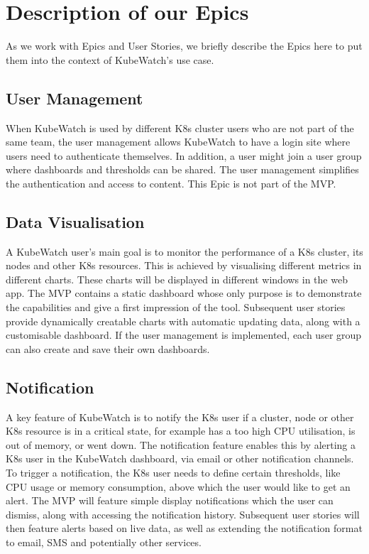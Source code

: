 
\section{Description of our Epics}

As we work with Epics and User Stories, we briefly describe the Epics here to put them into the context of KubeWatch's use case.

\subsection{User Management}
When KubeWatch is used by different K8s cluster users who are not part of the same team, the user management allows KubeWatch to have a login site where users need to authenticate themselves. In addition, a user might join a user group where dashboards and thresholds can be shared. The user management simplifies the authentication and access to content. This Epic is not part of the MVP.

\subsection{Data Visualisation}
A KubeWatch user's main goal is to monitor the performance of a K8s cluster, its nodes and other K8s resources. This is achieved by visualising different metrics in different charts. These charts will be displayed in different windows in the web app. The MVP contains a static dashboard whose only purpose is to demonstrate the capabilities and give a first impression of the tool. Subsequent user stories provide dynamically creatable charts with automatic updating data, along with a customisable dashboard. If the user management is implemented, each user group can also create and save their own dashboards.

\subsection{Notification}
A key feature of KubeWatch is to notify the K8s user if a cluster, node or other K8s resource is in a critical state, for example has a too high CPU utilisation, is out of memory, or went down. The notification feature enables this by alerting a K8s user in the KubeWatch dashboard, via email or other notification channels. To trigger a notification, the K8s user needs to define certain thresholds, like CPU usage or memory consumption, above which the user would like to get an alert. The MVP will feature simple display notifications which the user can dismiss, along with accessing the notification history. Subsequent user stories will then feature alerts based on live data, as well as extending the notification format to email, SMS and potentially other services.

